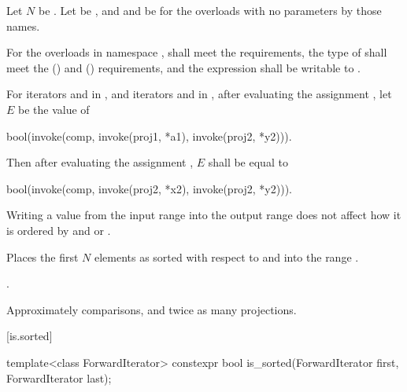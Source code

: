 \begin{itemdescr}
\pnum
Let $N$ be .
Let  be , and
 and  be 
for the overloads with no parameters by those names.

\pnum
\requires
For the overloads in namespace ,
 shall meet the
 requirements,
the type of  shall meet the
 () and
 () requirements,
and the expression 
shall be writable to .

\pnum
\expects
For iterators  and  in , and
iterators  and  in ,
after evaluating the assignment , let $E$ be the value of
\begin{codeblock}
bool(invoke(comp, invoke(proj1, *a1), invoke(proj2, *y2))).
\end{codeblock}
Then after evaluating the assignment ,
$E$ shall be equal to
\begin{codeblock}
bool(invoke(comp, invoke(proj2, *x2), invoke(proj2, *y2))).
\end{codeblock}
\begin{note}
Writing a value from the input range into the output range does not affect
how it is ordered by  and  or .
\end{note}

\pnum
\effects
Places the first $N$ elements
as sorted with respect to  and  into the range
.

\pnum
\returns
{}.

\pnum
\complexity
Approximately  comparisons,
and twice as many projections.
\end{itemdescr}

[is.sorted]{}

%
\begin{itemdecl}
template<class ForwardIterator>
  constexpr bool is_sorted(ForwardIterator first, ForwardIterator last);
\end{itemdecl}

